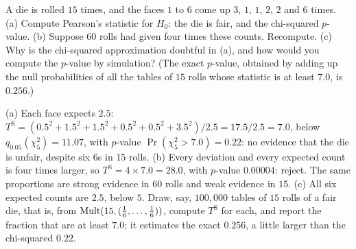 \begin{exercise}
\label{ex:gof-die}
A die is rolled $15$ times, and the faces $1$ to $6$ come up $3$, $1$, $1$, $2$, $2$ and $6$ times. (a) Compute Pearson's statistic for $H_0$: the die is fair, and the chi-squared $p$-value. (b) Suppose $60$ rolls had given four times these counts. Recompute. (c) Why is the chi-squared approximation doubtful in (a), and how would you compute the $p$-value by simulation? (The exact $p$-value, obtained by adding up the null probabilities of all the tables of $15$ rolls whose statistic is at least $7.0$, is $0.256$.)
\end{exercise}
\begin{solution}
(a) Each face expects $2.5$: $T^{\mathrm{S}} = (0.5^2 + 1.5^2 + 1.5^2 + 0.5^2 + 0.5^2 + 3.5^2)/2.5 = 17.5/2.5 = 7.0$, below $q_{0.05}(\chi^2_5) = 11.07$, with $p$-value $\Pr(\chi^2_5 > 7.0) = 0.22$: no evidence that the die is unfair, despite six $6$s in $15$ rolls. (b) Every deviation and every expected count is four times larger, so $T^{\mathrm{S}} = 4 \times 7.0 = 28.0$, with $p$-value $0.00004$: reject. The same proportions are strong evidence in $60$ rolls and weak evidence in $15$. (c) All six expected counts are $2.5$, below $5$. Draw, say, $100{,}000$ tables of $15$ rolls of a fair die, that is, from $\mathrm{Mult}(15, (\frac16, \ldots, \frac16))$, compute $T^{\mathrm{S}}$ for each, and report the fraction that are at least $7.0$; it estimates the exact $0.256$, a little larger than the chi-squared $0.22$.
\end{solution}

